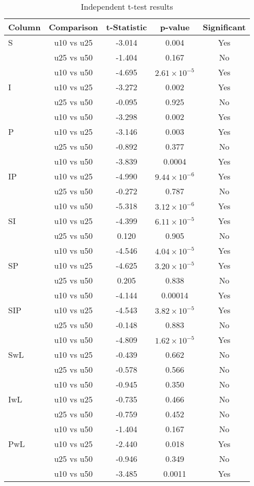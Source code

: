 \documentclass{article}
\begin{document}
\begin{table}[ht!]
\centering
\begin{tabular}{lcccc}
\toprule
Column & Comparison & t-Statistic & p-value & Significant \\
\midrule
S   & u10 vs u25 & -3.014 & 0.004 & Yes \\
    & u25 vs u50 & -1.404 & 0.167 & No \\
    & u10 vs u50 & -4.695 & $2.61 \times 10^{-5}$ & Yes \\
I   & u10 vs u25 & -3.272 & 0.002 & Yes \\
    & u25 vs u50 & -0.095 & 0.925 & No \\
    & u10 vs u50 & -3.298 & 0.002 & Yes \\
P   & u10 vs u25 & -3.146 & 0.003 & Yes \\
    & u25 vs u50 & -0.892 & 0.377 & No \\
    & u10 vs u50 & -3.839 & 0.0004 & Yes \\
IP  & u10 vs u25 & -4.990 & $9.44 \times 10^{-6}$ & Yes \\
    & u25 vs u50 & -0.272 & 0.787 & No \\
    & u10 vs u50 & -5.318 & $3.12 \times 10^{-6}$ & Yes \\
SI  & u10 vs u25 & -4.399 & $6.11 \times 10^{-5}$ & Yes \\
    & u25 vs u50 & 0.120  & 0.905 & No \\
    & u10 vs u50 & -4.546 & $4.04 \times 10^{-5}$ & Yes \\
SP  & u10 vs u25 & -4.625 & $3.20 \times 10^{-5}$ & Yes \\
    & u25 vs u50 & 0.205  & 0.838 & No \\
    & u10 vs u50 & -4.144 & 0.00014 & Yes \\
SIP & u10 vs u25 & -4.543 & $3.82 \times 10^{-5}$ & Yes \\
    & u25 vs u50 & -0.148 & 0.883 & No \\
    & u10 vs u50 & -4.809 & $1.62 \times 10^{-5}$ & Yes \\
SwL & u10 vs u25 & -0.439 & 0.662 & No \\
    & u25 vs u50 & -0.578 & 0.566 & No \\
    & u10 vs u50 & -0.945 & 0.350 & No \\
IwL & u10 vs u25 & -0.735 & 0.466 & No \\
    & u25 vs u50 & -0.759 & 0.452 & No \\
    & u10 vs u50 & -1.404 & 0.167 & No \\
PwL & u10 vs u25 & -2.440 & 0.018 & Yes \\
    & u25 vs u50 & -0.946 & 0.349 & No \\
    & u10 vs u50 & -3.485 & 0.0011 & Yes \\
\bottomrule
\end{tabular}
\caption{Independent t-test results}\label{tab:independent-ttests}
\end{table}
\end{document}
